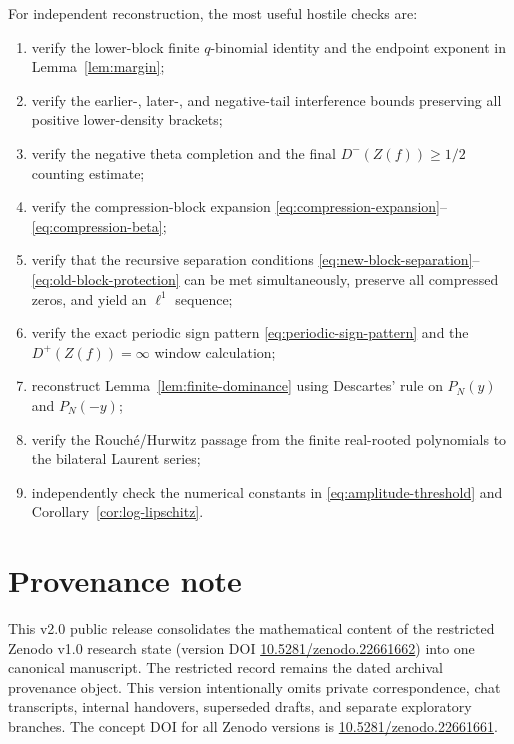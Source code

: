 \documentclass[11pt]{article}
\begin{document}
For independent reconstruction, the most useful hostile checks are:
\begin{enumerate}[leftmargin=2em]
  \item verify the lower-block finite $q$-binomial identity and the endpoint exponent in Lemma~\ref{lem:margin};
  \item verify the earlier-, later-, and negative-tail interference bounds preserving all positive lower-density brackets;
  \item verify the negative theta completion and the final $D^-(Z(f))\ge1/2$ counting estimate;
  \item verify the compression-block expansion \eqref{eq:compression-expansion}--\eqref{eq:compression-beta};
  \item verify that the recursive separation conditions \eqref{eq:new-block-separation}--\eqref{eq:old-block-protection} can be met simultaneously, preserve all compressed zeros, and yield an $\ell^1$ sequence;
  \item verify the exact periodic sign pattern \eqref{eq:periodic-sign-pattern} and the $D^+(Z(f))=\infty$ window calculation;
  \item reconstruct Lemma~\ref{lem:finite-dominance} using Descartes' rule on $P_N(y)$ and $P_N(-y)$;
  \item verify the Rouch\'e/Hurwitz passage from the finite real-rooted polynomials to the bilateral Laurent series;
  \item independently check the numerical constants in \eqref{eq:amplitude-threshold} and Corollary~\ref{cor:log-lipschitz}.
\end{enumerate}

\section*{Provenance note}
This v2.0 public release consolidates the mathematical content of the restricted Zenodo v1.0 research state (version DOI \href{https://doi.org/10.5281/zenodo.22661662}{10.5281/zenodo.22661662}) into one canonical manuscript. The restricted record remains the dated archival provenance object. This version intentionally omits private correspondence, chat transcripts, internal handovers, superseded drafts, and separate exploratory branches. The concept DOI for all Zenodo versions is \href{https://doi.org/10.5281/zenodo.22661661}{10.5281/zenodo.22661661}.
\end{document}
